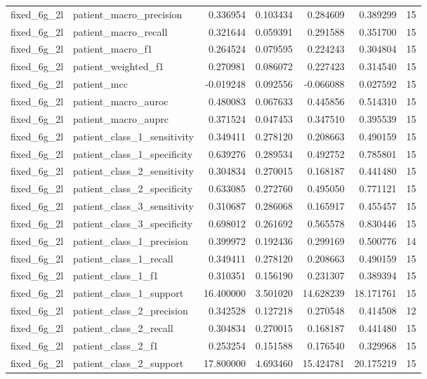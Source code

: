 \begin{tabular}{llrrrrr}
fixed_6g_2l & patient_macro_precision & 0.336954 & 0.103434 & 0.284609 & 0.389299 & 15 \\
fixed_6g_2l & patient_macro_recall & 0.321644 & 0.059391 & 0.291588 & 0.351700 & 15 \\
fixed_6g_2l & patient_macro_f1 & 0.264524 & 0.079595 & 0.224243 & 0.304804 & 15 \\
fixed_6g_2l & patient_weighted_f1 & 0.270981 & 0.086072 & 0.227423 & 0.314540 & 15 \\
fixed_6g_2l & patient_mcc & -0.019248 & 0.092556 & -0.066088 & 0.027592 & 15 \\
fixed_6g_2l & patient_macro_auroc & 0.480083 & 0.067633 & 0.445856 & 0.514310 & 15 \\
fixed_6g_2l & patient_macro_auprc & 0.371524 & 0.047453 & 0.347510 & 0.395539 & 15 \\
fixed_6g_2l & patient_class_1_sensitivity & 0.349411 & 0.278120 & 0.208663 & 0.490159 & 15 \\
fixed_6g_2l & patient_class_1_specificity & 0.639276 & 0.289534 & 0.492752 & 0.785801 & 15 \\
fixed_6g_2l & patient_class_2_sensitivity & 0.304834 & 0.270015 & 0.168187 & 0.441480 & 15 \\
fixed_6g_2l & patient_class_2_specificity & 0.633085 & 0.272760 & 0.495050 & 0.771121 & 15 \\
fixed_6g_2l & patient_class_3_sensitivity & 0.310687 & 0.286068 & 0.165917 & 0.455457 & 15 \\
fixed_6g_2l & patient_class_3_specificity & 0.698012 & 0.261692 & 0.565578 & 0.830446 & 15 \\
fixed_6g_2l & patient_class_1_precision & 0.399972 & 0.192436 & 0.299169 & 0.500776 & 14 \\
fixed_6g_2l & patient_class_1_recall & 0.349411 & 0.278120 & 0.208663 & 0.490159 & 15 \\
fixed_6g_2l & patient_class_1_f1 & 0.310351 & 0.156190 & 0.231307 & 0.389394 & 15 \\
fixed_6g_2l & patient_class_1_support & 16.400000 & 3.501020 & 14.628239 & 18.171761 & 15 \\
fixed_6g_2l & patient_class_2_precision & 0.342528 & 0.127218 & 0.270548 & 0.414508 & 12 \\
fixed_6g_2l & patient_class_2_recall & 0.304834 & 0.270015 & 0.168187 & 0.441480 & 15 \\
fixed_6g_2l & patient_class_2_f1 & 0.253254 & 0.151588 & 0.176540 & 0.329968 & 15 \\
fixed_6g_2l & patient_class_2_support & 17.800000 & 4.693460 & 15.424781 & 20.175219 & 15 \\

\end{tabular}
